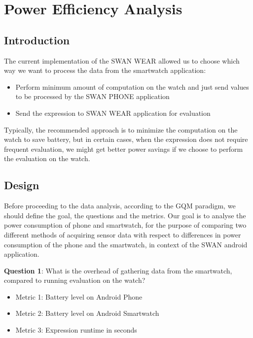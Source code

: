 
\chapter{Power Efficiency Analysis} %

\label{Chapter6} %



\section{Introduction}
The current implementation of the SWAN WEAR allowed us to choose which way we want to process the data from the smartwatch application:
\begin{itemize}
 \item Perform minimum amount of computation on the watch and just send values to be processed by the SWAN PHONE application
 \item Send the expression to SWAN WEAR application for evaluation
\end{itemize}

Typically, the recommended approach is to minimize the computation on the watch to save battery, but in certain cases,  when the expression does not require frequent evaluation, we might get better power savings if we choose to perform the evaluation on the watch.

\section{Design}
Before proceeding to the data analysis, according to the GQM\cite{gqm_1}\cite{gqm_2} paradigm, we should define the goal, the questions and the metrics.
    Our goal is to analyse the power consumption of phone and smartwatch, for the purpose of comparing two different methods of acquiring sensor data
    with respect to differences in power consumption of the phone and the smartwatch, in context of the SWAN android application.

\textbf{Question 1}: What is the overhead of gathering data from the smartwatch, compared to running evaluation on the watch?
\begin{itemize}
  \item Metric 1:  Battery level on Android Phone
  \item Metric 2:  Battery level on Android Smartwatch
  \item  Metric 3:  Expression runtime in seconds
\end{itemize}

